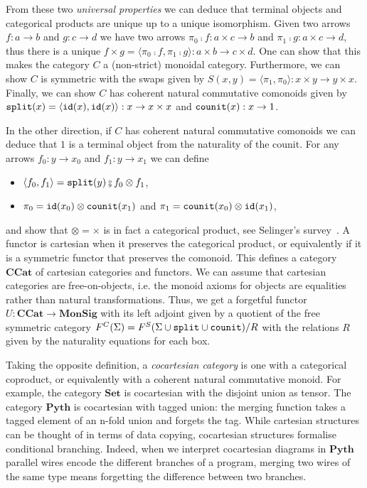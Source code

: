 From these two \emph{universal properties} we can deduce that terminal objects and categorical products are unique up to a unique isomorphism.
Given two arrows $f : a \to b$ and $g : c \to d$ we have two arrows $\pi_0 \fcmp f : a \times c \to b$ and $\pi_1 \fcmp g : a \times c \to d$, thus there is a unique $f \times  g = \langle \pi_0 \fcmp f, \pi_1 \fcmp g \rangle : a \times b \to c \times d$.
One can show that this makes the category $C$ a (non-strict) monoidal category.
Furthermore, we can show $C$ is symmetric with the swaps given by $S(x, y) = \langle \pi_1, \pi_0 \rangle : x \times y \to y \times x$.
Finally, we can show $C$ has coherent natural commutative comonoids given by $\mathtt{split}(x) = \langle \mathtt{id}(x), \mathtt{id}(x) \rangle : x \to x \times x$ and $\mathtt{counit}(x) : x \to 1$.

In the other direction, if $C$ has coherent natural commutative comonoids we can deduce that $1$ is a terminal object from the naturality of the counit.
For any arrows $f_0 : y \to x_0$ and $f_1 : y \to x_1$ we can define
\begin{itemize}
\item $\langle f_0, f_1 \rangle = \ttsplit(y) \fcmp f_0 \otimes f_1$,
\item $\pi_0 = \mathtt{id}(x_0) \otimes \mathtt{counit}(x_1)$ and $\pi_1 = \mathtt{counit}(x_0) \otimes \mathtt{id}(x_1)$,
\end{itemize}
and show that $\otimes = \times$ is in fact a categorical product, see Selinger's survey~\cite[Section 6.1]{Selinger10}.
A functor is cartesian when it preserves the categorical product, or equivalently if it is a symmetric functor that preserves the comonoid.
This defines a category $\mathbf{CCat}$ of cartesian categories and functors.
We can assume that cartesian categories are free-on-objects, i.e. the monoid axioms for objects are equalities rather than natural transformations.
Thus, we get a forgetful functor $U : \mathbf{CCat} \to \mathbf{MonSig}$ with its left adjoint given by a quotient of the free symmetric category $F^C(\Sigma) = F^S(\Sigma \cup \mathtt{split} \cup \mathtt{counit}) / R$ with the relations $R$ given by the naturality equations for each box.

Taking the opposite definition, a \emph{cocartesian category} is one with a categorical coproduct, or equivalently with a coherent natural commutative monoid.
For example, the category $\mathbf{Set}$ is cocartesian with the disjoint union as tensor.
The category $\mathbf{Pyth}$ is cocartesian with tagged union: the merging function takes a tagged element of an n-fold union and forgets the tag.
While cartesian structures can be thought of in terms of data copying, cocartesian structures formalise conditional branching.
Indeed, when we interpret cocartesian diagrams in $\mathbf{Pyth}$ parallel wires encode the different branches of a program, merging two wires of the same type means forgetting the difference between two branches.

